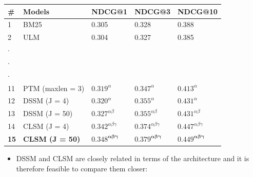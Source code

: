 \begin{multicols*}{3}
\begin{table}[]
	\begin{tabular}{l|l|l|l|l}
		\#                                                & Models           & NDCG@1 & NDCG@3 & NDCG@10 \\
		\hline
		1                                                 & BM25             & 0.305  & 0.328  & 0.388   \\
		2                                                 & ULM              & 0.304  & 0.327  & 0.385   \\
		$\cdot$ &                  &        &        &         \\
		$\cdot$ &                  &        &        &         \\
		$\cdot$ &                  &        &        &         \\
		11                                                & PTM (maxlen = 3) & $0.319^\alpha$  & $0.347^\alpha$  & $0.413^\alpha$   \\
		12                                                & DSSM (J = 4)     & $0.320^{\alpha}$ & $0.355^{\alpha}$  & $0.431^{\alpha}$   \\
		13                                                & DSSM (J = 50)    & $0.327^{\alpha \beta}$  & $0.355^{\alpha \beta}$  & $0.431^{\alpha \beta}$   \\
		14                                                & CLSM (J = 4)     & $0.342^{\alpha \beta \gamma}$  & $0.374^{\alpha \beta \gamma}$  & $0.447^{\alpha \beta \gamma}$   \\
		\textbf{15}                                                & \textbf{CLSM (J = 50)}    & $\mathbf{0.348^{\alpha \beta \gamma}}$  & $\mathbf{0.379^{\alpha \beta \gamma}}$  & $\mathbf{0.449^{\alpha \beta \gamma}}$  
	\end{tabular}
	\vspace{5mm}
\end{table}

\begin{itemize}
	\item DSSM and CLSM are closely related in terms of the architecture and it is therefore feasible to compare them closer:
\end{itemize}

\begin{figure}
	

\end{figure}
\end{multicols*}
